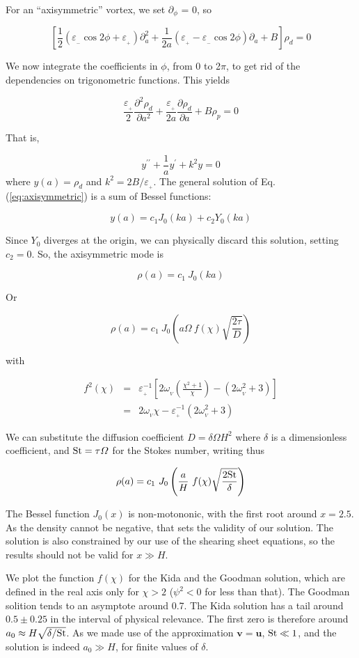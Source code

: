 \documentclass[useAMS,8pt,twocolumn]{article}
\newcommand{\pderiv}[2]{\frac{\partial #1}{\partial #2}}
\newcommand{\pderivn}[3]{\frac{\partial^{#3} #1}{\partial #2^{#3}}}
\renewcommand{\v}[1]{{\boldsymbol{#1}}} %
\newcommand{\Eq}[1]{Eq. (\ref{#1})}
\newcommand{\eq}[1]{\Eq{#1}}
\newcommand{\beq}{\begin{equation}}
\newcommand{\eeq}{\end{equation}}
\newcommand{\beqn}{\begin{eqnarray}}
\newcommand{\eeqn}{\end{eqnarray}}
\newcommand{\epsp}{\varepsilon_{_{+}}}
\newcommand{\epsm}{\varepsilon_{_{-}}}
\begin{document}
For an ``axisymmetric'' vortex, we set $\partial_\phi$ = 0, so 

\beq
\left[\frac{1}{2}\left( \epsm \cos 2\phi +\epsp\right) \partial^2_a   + \frac{1}{2a}\left( \epsp - \epsm\cos 2\phi\right) \partial_a  + B\right] \rho_d = 0 
\eeq

We now integrate the coefficients in $\phi$, from 0 to 2$\pi$, to get
rid of the dependencies on trigonometric functions. This yields

\beq
\frac{\epsp}{2}\pderivn{\rho_d}{a}{2} +
\frac{\epsp}{2a}\pderiv{\rho_d}{a} + B \rho_p = 0  
\eeq

That is, 

\beq
y^{\prime\prime} + \frac{1}{a}y^\prime + k^2 y = 0 
\label{eq:axisymmetric}
\eeq where $y(a) = \rho_d$ and $k^2 = 2B/\epsp$.  The general solution of \eq{eq:axisymmetric} is a
sum of Bessel functions: 

\beq
y(a) = c_1 J_0 (ka) + c_2 Y_0(ka) 
\eeq

Since  $Y_0$ diverges at the origin, we can physically discard 
this solution, setting $c_2=0$. So, the axisymmetric mode is

\beq
\rho(a) = c_1 \ J_0 (ka)
\eeq

Or

\beq
\rho(a) = c_1 \ J_0 \left(a\varOmega \ f(\chi) \sqrt{\frac{2\tau}{D}} \right)
\eeq

\noindent with 

\beqn
f^2(\chi) &=& \epsp^{-1} \left[2\omega_{_V}\left(\frac{\chi^2+1}{\chi}\right) - (2\omega_{_V}^2 + 3) \right]\nonumber \\
          &=& 2\omega_{_V}\chi - \epsp^{-1}(2\omega_{_V}^2 + 3)
\eeqn

We can substitute the diffusion coefficient $D=\delta \varOmega H^2$ where 
$\delta$ is a dimensionless coefficient, and ${\rm St} = \tau\varOmega$ for 
the Stokes number, writing thus 

\beq
\rho(a) = c_1 \ J_0 \left(\frac{a}{H} \ f(\chi) \sqrt{\frac{2{\rm St}}{\delta}}\right)
\eeq 

The Bessel function $J_0(x)$ is
non-motononic, with the first root around $x=2.5$. As the density
cannot be negative, that sets the validity of our solution. The
solution is also constrained by our use of the shearing sheet
equations, so the results should not be valid for $x \gg H$. 
 
We plot the function $f(\chi)$ for the Kida and the Goodman
solution, which are defined in the real axis only for $\chi > 2$ ($\psi^2
< 0$ for less than that). The Goodman solition tends to an asymptote
around 0.7. The Kida solution has a  tail around $0.5\pm0.25$ in the
interval of physical relevance. The first zero is therefore around
$a_0 \approx H \sqrt{\delta/{\rm St}}$.  As we made use of the
approximation $\v{v}=\v{u}$, ${\rm St} \ll 1$, and the solution is indeed $a_0 \gg H$, for finite values of $\delta$.
\end{document}
